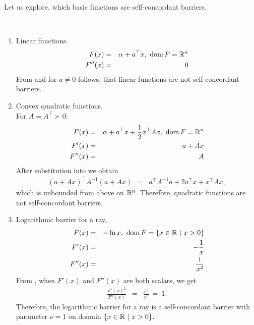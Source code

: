 Let us explore, which basic functions are self-concordant barriers.

\begin{example}~\\[-0.5cm]
  \begin{enumerate}
    \item Linear functions.
      \begin{eqnarray}
        F(x) &=& \alpha + a^\top x,\ \operatorname{dom} F = \mathbb{R}^n\\
        F''(x) &=& 0
      \end{eqnarray}
      From  and for $a \neq 0$ follows, that linear functions are not self-concordant barriers.

    \item Convex quadratic functions.\\
      For $A = A^\top \succ 0$:
      \begin{eqnarray}
        F(x) &=& \alpha + a^\top x + \frac{1}{2} x^\top Ax,\ \dom F = \R^n\\
        F'(x) &=& a + Ax\\
        F''(x) &=& A
      \end{eqnarray}
      After substitution into  we obtain
      \begin{eqnarray}
        (a + Ax)^\top A^{-1}(a + Ax) &=& a^\top A^{-1}a + 2a^\top x + x^\top Ax,
      \end{eqnarray}
      which is unbounded from above on $\mathbb{R}^n$. Therefore, quadratic functions are not self-concordant barriers.
      

    \item Logarithmic barrier for a ray.
      \begin{eqnarray}
        F(x) &=& -\ln x,\ \operatorname{dom} F = \{x\in\mathbb{R}\ |\ x > 0\}\\
        F'(x) &=& -\frac{1}{x}\\
        F''(x) &=& \frac{1}{x^2}
      \end{eqnarray}
      From , when $F'(x)$ and $F''(x)$ are both scalars, we get
      \begin{eqnarray}
        \frac{F'(x)^2}{F''(x)} &=& \frac{x^2}{x^2}\ =\ 1.
      \end{eqnarray}
      Therefore, the logarithmic barrier for a ray is a self-concordant barrier with parameter $\nu = 1$ on domain $\{x\in\mathbb{R}\ |\ x > 0\}$.
  \end{enumerate}
\end{example}

